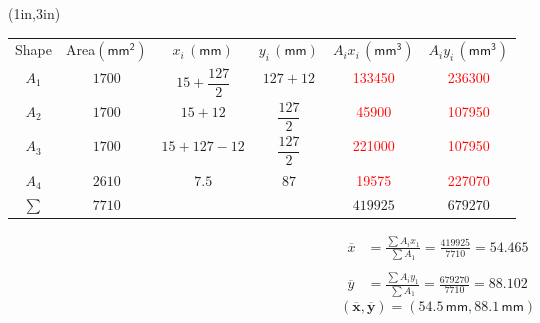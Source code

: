 \documentclass[10pt,oneside]{article}
\begin{document}
\begin{textblock*}{6.5in}(1in,3in)
	\centering	
	\Large\parb\vspace{1cm}\centering
	\begin{tabular}{cccccc}
			Shape  & Area$ (\mathsf{mm^2})$  & $x_i\,\mathsf{(mm)}$ & $y_i\,\mathsf{(mm)}$ & $A_ix_i\,\mathsf{(mm^3)}$ & $A_iy_i\,\mathsf{ (mm^3)}$   \\
			\addlinespace
			\toprule\addlinespace
			$A_1$  & $1700$   & $15+\dfrac{127}{2}$  & $127+12$ & \textcolor{red}{133450} & \textcolor{red}{236300}  \\
			\addlinespace\midrule\addlinespace
			$A_2$  & $1700$ & $15+12$  & $\dfrac{127}{2}$ & \textcolor{red}{45900} & \textcolor{red}{107950}  \\
			\addlinespace\midrule\addlinespace
			$A_3$  & $1700$  & $15+127-12$ &  $\dfrac{127}{2}$  & \textcolor{red}{221000} & \textcolor{red}{107950}  \\
			\addlinespace\midrule\addlinespace
			$A_4$  & $2610$  & $7.5$ & $87$  & \textcolor{red}{19575} & \textcolor{red}{227070}  \\
			
			\addlinespace\bottomrule\addlinespace
			{$\sum$} & \textcolor{saitRed}{$7710$} &  & & \textcolor{saitRed}{$419925$} & \textcolor{saitRed}{$679270$}
		\end{tabular}
		\parb
		\begin{align*}
			\overline{x} &= \frac{\sum A_ix_1}{\sum A_1}=\frac{419925}{7710} = 54.465 \\\\
			\overline{y} &= \frac{\sum A_iy_1}{\sum A_1}=\frac{679270}{7710} = 88.102
		\end{align*}
		\parb
		$$ \bm{(\overline{x}, \overline{y}) = (54.5\,\mathsf{mm}, 88.1\,\mathsf{mm})} $$
\end{textblock*}
\end{document}
